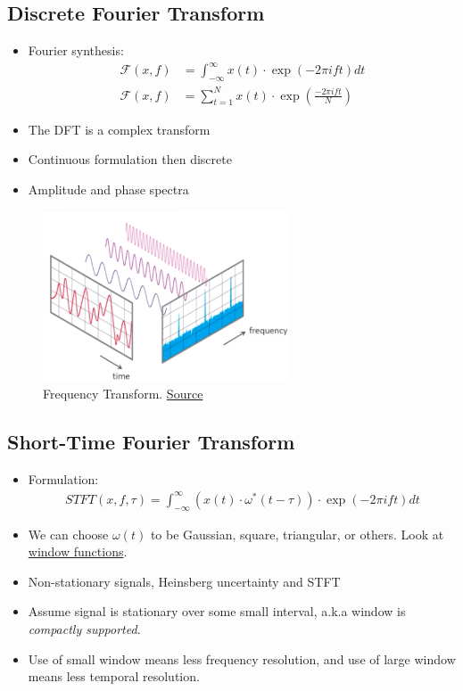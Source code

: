 \documentclass[paper=a4, fontsize=12pt]{scrartcl} %
\numberwithin{equation}{section} %
\numberwithin{figure}{section} %
\numberwithin{table}{section} %
\begin{document}
\subsection{Discrete Fourier Transform}

\begin{itemize}
    \item Fourier synthesis:
    \begin{align*}
        \mathcal{F}(x, f) &= \int_{-\infty}^{\infty} x(t) \cdot \exp \left( -2 \pi i f t \right) dt \\
        \mathcal{F}(x, f) &= \sum_{t=1}^{N} x(t) \cdot \exp \left( \frac{-2 \pi i f t }{N} \right)
    \end{align*}
    \item The DFT is a complex transform
    \item Continuous formulation then discrete
    \item Amplitude and phase spectra
\end{itemize}

\begin{figure}[H]
    \centering
    \includegraphics[width=0.65\textwidth]{images/freq}
    \caption{Frequency Transform. \href{https://towardsdatascience.com/fourier-transformation-and-its-mathematics-fff54a6f6659}{Source}}
\end{figure}

\subsection{Short-Time Fourier Transform}

\begin{itemize}
    \item Formulation:
    \begin{align*}
        STFT(x, f, \tau) = \int_{-\infty}^{\infty} \left( x(t) \cdot \omega^*(t - \tau) \right) \cdot \exp \left( -2 \pi i f t \right) dt
    \end{align*}
    \item We can choose $\omega(t)$ to be Gaussian, square, triangular, or others. Look at \href{https://en.wikipedia.org/wiki/Window_function}{window functions}.
    \item Non-stationary signals, Heinsberg uncertainty and STFT
    \item Assume signal is stationary over some small interval, a.k.a window is \textit{compactly supported}.
    \item Use of small window means less frequency resolution, and use of large window means less temporal resolution.
\end{itemize}
\end{document}
